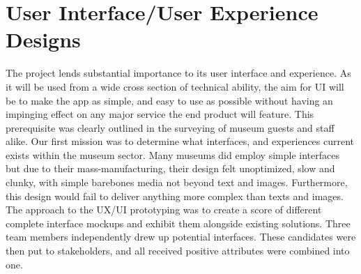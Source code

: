 \section{User Interface/User Experience Designs}
The project lends substantial importance to its user interface and experience. As it will be used from a wide cross section of technical ability, the aim for UI will be to make the app as simple, and easy to use as possible without having an impinging effect on any major service the end product will feature. This prerequisite was clearly outlined in the surveying of museum guests and staff alike. Our first mission was to determine what interfaces, and experiences current exists within the museum sector. Many museums did employ simple interfaces but due to their mass-manufacturing, their design felt unoptimized, slow and clunky, with simple barebones media not beyond text and images. Furthermore, this design would fail to deliver anything more complex than texts and images.\\
  
The approach to the UX/UI prototyping was to create a score of different complete interface mockups and exhibit them alongside existing solutions. Three team members independently drew up potential interfaces. These candidates were then put to stakeholders, and all received positive attributes were combined into one.